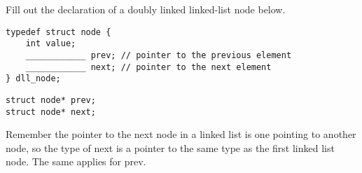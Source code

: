 \begin{blocksection}
\question
Fill out the declaration of a doubly linked linked-list node below.

\begin{verbatim}
typedef struct node {
    int value;
    ____________ prev; // pointer to the previous element
    ____________ next; // pointer to the next element 
} dll_node;
\end{verbatim}

\begin{solution}
\lstinline$struct node* prev;$ \\
\lstinline$struct node* next;$

Remember the pointer to the next node in a linked list is one pointing to another node, so the type of next is a pointer to the same type as the first linked list node. The same applies for prev.
\end{solution}
\end{blocksection}